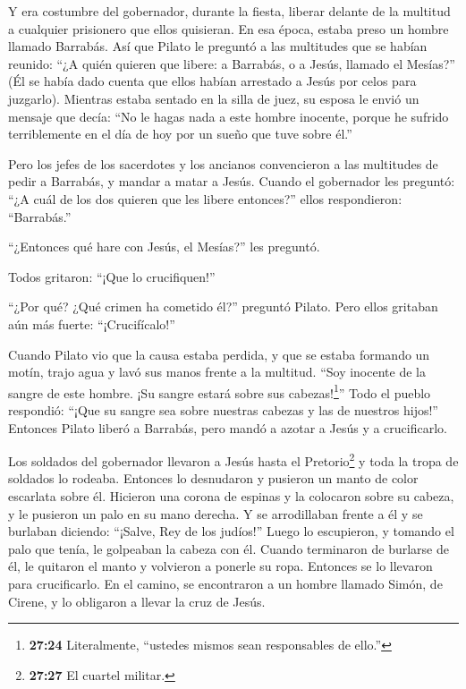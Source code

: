  Y era costumbre del gobernador, durante la fiesta, liberar
delante de la multitud a cualquier prisionero que ellos quisieran.
 En esa época, estaba preso un hombre llamado Barrabás.
 Así que Pilato le preguntó a las multitudes que se habían
reunido: ``¿A quién quieren que libere: a Barrabás, o a Jesús, llamado
el Mesías?''  (Él se había dado cuenta que ellos habían
arrestado a Jesús por celos para juzgarlo).  Mientras
estaba sentado en la silla de juez, su esposa le envió un mensaje que
decía: ``No le hagas nada a este hombre inocente, porque he sufrido
terriblemente en el día de hoy por un sueño que tuve sobre él.''

 Pero los jefes de los sacerdotes y los ancianos
convencieron a las multitudes de pedir a Barrabás, y mandar a matar a
Jesús.  Cuando el gobernador les preguntó: ``¿A cuál de los
dos quieren que les libere entonces?'' ellos respondieron: ``Barrabás.''

 ``¿Entonces qué hare con Jesús, el Mesías?'' les preguntó.

Todos gritaron: ``¡Que lo crucifiquen!''

 ``¿Por qué? ¿Qué crimen ha cometido él?'' preguntó Pilato.
Pero ellos gritaban aún más fuerte: ``¡Crucifícalo!''

 Cuando Pilato vio que la causa estaba perdida, y que se
estaba formando un motín, trajo agua y lavó sus manos frente a la
multitud. ``Soy inocente de la sangre de este hombre. ¡Su sangre estará
sobre sus cabezas!\footnote{\textbf{27:24} Literalmente, ``ustedes
  mismos sean responsables de ello.''}''  Todo el pueblo
respondió: ``¡Que su sangre sea sobre nuestras cabezas y las de nuestros
hijos!''  Entonces Pilato liberó a Barrabás, pero mandó a
azotar a Jesús y a crucificarlo.

 Los soldados del gobernador llevaron a Jesús hasta el
Pretorio\footnote{\textbf{27:27} El cuartel militar.} y toda la tropa de
soldados lo rodeaba.  Entonces lo desnudaron y pusieron un
manto de color escarlata sobre él.  Hicieron una corona de
espinas y la colocaron sobre su cabeza, y le pusieron un palo en su mano
derecha. Y se arrodillaban frente a él y se burlaban diciendo: ``¡Salve,
Rey de los judíos!''  Luego lo escupieron, y tomando el
palo que tenía, le golpeaban la cabeza con él.  Cuando
terminaron de burlarse de él, le quitaron el manto y volvieron a ponerle
su ropa. Entonces se lo llevaron para crucificarlo.  En el
camino, se encontraron a un hombre llamado Simón, de Cirene, y lo
obligaron a llevar la cruz de Jesús.

